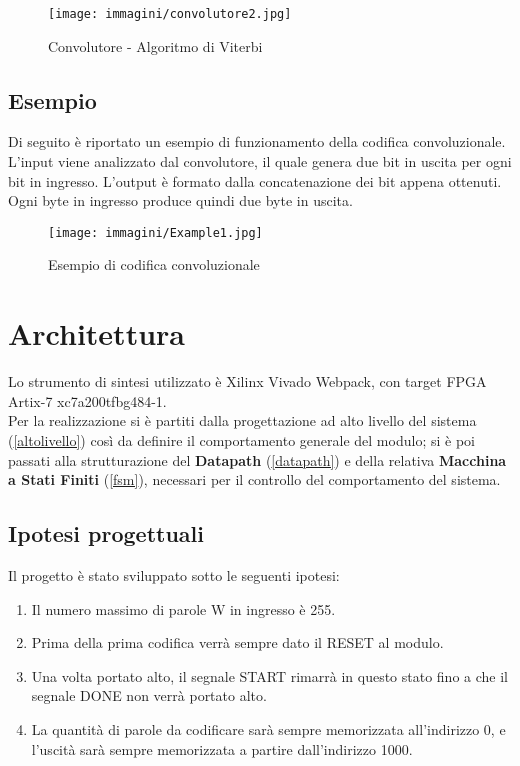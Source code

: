\documentclass{article}
\begin{document}
\begin{figure}[h!]
    \centering
    \texttt{[image: immagini/convolutore2.jpg]}
    \caption{Convolutore - Algoritmo di Viterbi}
\end{figure}

\subsection{Esempio}
Di seguito è riportato un esempio di funzionamento della codifica convoluzionale.\\
L'input viene analizzato dal convolutore, il quale genera due bit in uscita per ogni bit in ingresso. L'output è formato dalla concatenazione dei bit appena ottenuti.
Ogni byte in ingresso produce quindi due byte in uscita.

\begin{figure}[H]
    \centering
    \texttt{[image: immagini/Example1.jpg]}
    \caption{Esempio di codifica convoluzionale}
\end{figure}

\clearpage
 

\section{Architettura}
Lo strumento di sintesi utilizzato è Xilinx Vivado Webpack, con target FPGA Artix-7 xc7a200tfbg484-1.
\\
Per la realizzazione si è partiti dalla progettazione ad alto livello del sistema (\ref{altolivello}) così da definire il comportamento generale del modulo; si è poi passati alla strutturazione del \textbf{Datapath} (\ref{datapath}) e della relativa \textbf{Macchina a Stati Finiti} (\ref{fsm}), necessari per il controllo del comportamento del sistema. 

\subsection{Ipotesi progettuali}
\label{ipotesi}
Il progetto è stato sviluppato sotto le seguenti ipotesi:
\begin{enumerate}
    \item Il numero massimo di parole W in ingresso è 255.
    \item Prima della prima codifica verrà sempre dato il RESET al modulo.
    \item Una volta portato alto, il segnale START rimarrà in questo stato fino a che il segnale DONE non verrà portato alto.
    \item La quantità di parole da codificare sarà sempre memorizzata all'indirizzo 0, e l'uscità sarà sempre memorizzata a partire dall'indirizzo 1000.
\end{enumerate}
\end{document}
